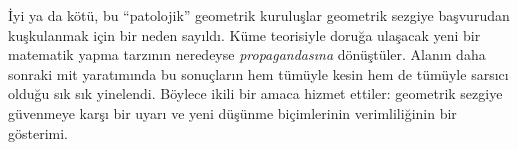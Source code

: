 \documentclass[../../../include/open-logic-section]{subfiles}
\begin{document}
İyi ya da kötü, bu ``patolojik'' geometrik kuruluşlar geometrik sezgiye
başvurudan kuşkulanmak için bir neden sayıldı. Küme teorisiyle doruğa ulaşacak
yeni bir matematik yapma tarzının neredeyse \emph{propagandasına} dönüştüler.
Alanın daha sonraki mit yaratımında bu sonuçların hem tümüyle kesin hem de
tümüyle sarsıcı olduğu sık sık yinelendi. Böylece ikili bir amaca hizmet
ettiler: geometrik sezgiye güvenmeye karşı bir uyarı ve yeni düşünme
biçimlerinin verimliliğinin bir gösterimi.
\end{document}
